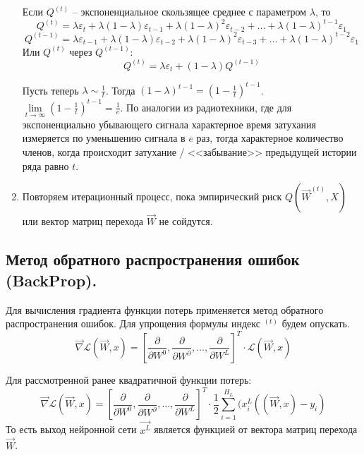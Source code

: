 \begin{enumerate}
	      Если $Q^{(t)}$ -- экспоненциальное скользящее среднее с параметром $\lambda$, то
	      $$
		      Q^{(t)} = \lambda \varepsilon_t + \lambda (1-\lambda) \varepsilon_{t-1} + \lambda (1-\lambda)^2 \varepsilon_{t-2} + \dots + \lambda (1-\lambda)^{t-1} \varepsilon_{1}
	      $$
	      $$
		      Q^{(t - 1)} = \lambda \varepsilon_{t-1} + \lambda (1-\lambda) \varepsilon_{t-2} + \lambda (1-\lambda)^2 \varepsilon_{t-3} + \dots + \lambda (1-\lambda)^{t-2} \varepsilon_{1}
	      $$
	      Или $Q^{(t)}$ через $Q^{(t-1)}$:
	      $$
		      Q^{(t)} = \lambda \varepsilon_t + (1 - \lambda) Q^{(t - 1)}
	      $$

	      Пусть теперь $\lambda \sim \frac{1}{t}$. Тогда $(1-\lambda)^{t-1} = (1 - \frac{1}{t})^{t-1}$. $\lim\limits_{t\rightarrow \infty} (1 - \frac{1}{t})^{t-1} = \frac{1}{e}$. По аналогии из радиотехники, где для экспоненциально убывающего сигнала характерное время затухания измеряется по уменьшению сигнала в $e$ раз, тогда характерное количество членов, когда происходит затухание / <<забывание>> предыдущей истории ряда равно $t$.

	\item Повторяем итерационный процесс, пока эмпирический риск $Q(\overrightarrow{W}^{(t)}, X)$ или вектор матриц перехода $\overrightarrow{W}$ не сойдутся.
\end{enumerate}

\subsection{Метод обратного распространения ошибок (BackProp).}

Для вычисления градиента функции потерь применяется метод обратного распространения ошибок. Для упрощения формулы индекс ${}^{(t)}$ будем опускать.
$$
	\overrightarrow{\nabla} \mathcal{L} (\overrightarrow{W}, x) = \left[\frac{\partial}{\partial W^0}, \frac{\partial}{\partial W^\partial}, \dots, \frac{\partial}{\partial W^L}\right]^T \cdot \mathcal{L} (\overrightarrow{W}, x)
$$

Для рассмотренной ранее квадратичной функции потерь:
$$
	\overrightarrow{\nabla} \mathcal{L} (\overrightarrow{W}, x) = \left[\frac{\partial}{\partial W^0}, \frac{\partial}{\partial W^\partial}, \dots, \frac{\partial}{\partial W^L}\right]^T \cdot \frac{1}{2} \sum\limits_{i = 1}^{H_L} (x^L_i ((\overrightarrow{W}, x) - y_i)
$$
То есть выход нейронной сети $\overrightarrow{x^L}$ является функцией от вектора матриц перехода $\overrightarrow{W}$.

